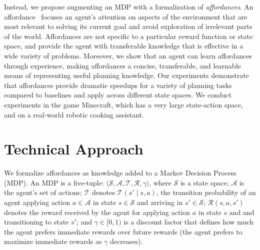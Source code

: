 \documentclass[conference]{IEEEtran}
\begin{document}
Instead, we propose augmenting an MDP with a formalization of {\em
  affordances}. An affordance~\cite{gibson77} focuses an agent's
attention on aspects of the environment that are most relevant to
solving its current goal and avoid exploration of irrelevant parts of
the world. Affordances are not specific to a particular reward
function or state space, and provide the agent with transferable
knowledge that is effective in a wide variety of problems. Moreover,
we show that an agent can learn affordances through experience, making
affordances a concise, transferable, and learnable means of
representing useful planning knowledge.  Our experiments demonstrate
that affordances provide dramatic speedups for a variety of planning
tasks compared to baselines and apply across different state spaces.
We conduct experiments in the game Minecraft, which has a very large
state-action space, and on a real-world robotic cooking assistant.


\section{Technical Approach}
\label{sec:affordances}

We formalize affordances as knowledge added to a Markov Decision Process
(MDP).  An MDP is a five-tuple: $\langle \mathcal{S}, \mathcal{A},
\mathcal{T}, \mathcal{R}, \gamma \rangle$, where $\mathcal{S}$ is a
state space; $\mathcal{A}$ is the agent's set of actions;
$\mathcal{T}$ denotes $\mathcal{T}(s' \mid s,a)$, the transition
probability of an agent applying action $a \in \mathcal{A}$ in state
$s \in \mathcal{S}$ and arriving in $s' \in \mathcal{S}$;
$\mathcal{R}(s,a,s')$ denotes the reward received by the agent for
applying action $a$ in state $s$ and and transitioning to state $s'$;
and $\gamma \in [0, 1)$ is a discount factor that defines how much the
agent prefers immediate rewards over future rewards (the agent
prefers to maximize immediate rewards as $\gamma$ decreases).

\end{document}
